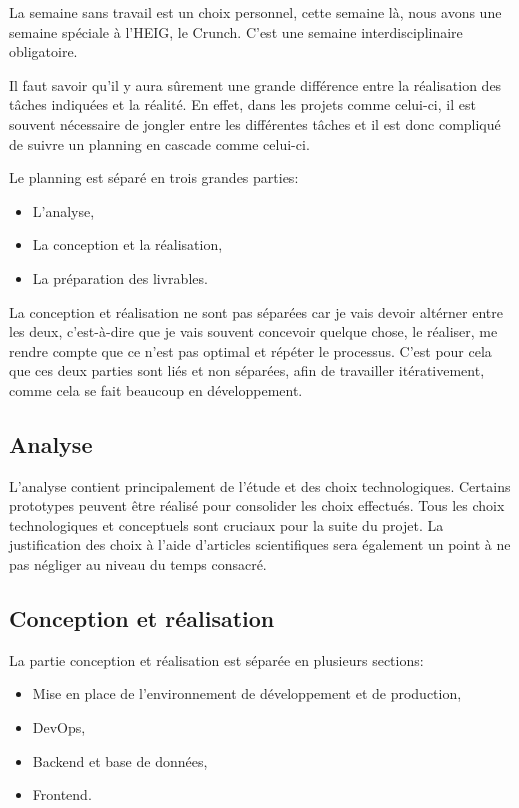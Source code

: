 \documentclass[
    iai, %
    il, %
]{heig-tb}
\begin{document}
La semaine sans travail est un choix personnel, cette semaine là, nous avons une semaine spéciale à l'HEIG, le Crunch. C'est une semaine interdisciplinaire obligatoire.

Il faut savoir qu'il y aura sûrement une grande différence entre la réalisation des tâches indiquées et la réalité. En effet, dans les projets comme celui-ci, il est souvent nécessaire de jongler entre les différentes tâches et il est donc compliqué de suivre un planning en cascade comme celui-ci.

Le planning est séparé en trois grandes parties:
\begin{itemize}
    \item L'analyse,
    \item La conception et la réalisation,
    \item La préparation des livrables.
\end{itemize}

La conception et réalisation ne sont pas séparées car je vais devoir altérner entre les deux, c'est-à-dire que je vais souvent concevoir quelque chose, le réaliser, me rendre compte que ce n'est pas optimal et répéter le processus. C'est pour cela que ces deux parties sont liés et non séparées, afin de travailler itérativement, comme cela se fait beaucoup en développement.

\subsection{Analyse}
L'analyse contient principalement de l'étude et des choix technologiques. Certains prototypes peuvent être réalisé pour consolider les choix effectués. Tous les choix technologiques et conceptuels sont cruciaux pour la suite du projet.\newline
La justification des choix à l'aide d'articles scientifiques sera également un point à ne pas négliger au niveau du temps consacré.

\subsection{Conception et réalisation}
La partie conception et réalisation est séparée en plusieurs sections:
\begin{itemize}
    \item Mise en place de l'environnement de développement et de production,
    \item DevOps,
    \item Backend et base de données,
    \item Frontend.
\end{itemize}
\end{document}
